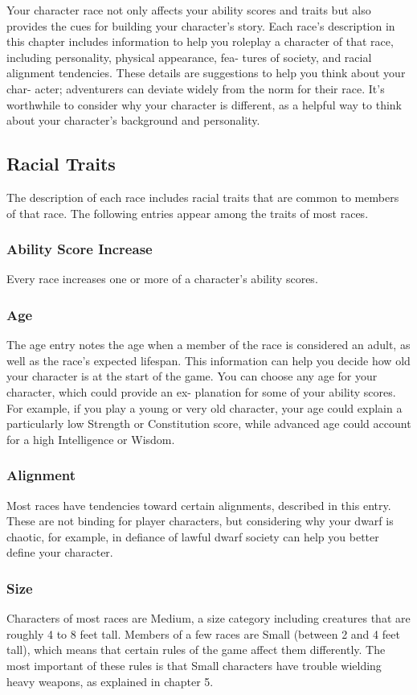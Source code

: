 Your character race not only affects your ability scores and traits but also provides the cues for building your character’s story. Each race’s description in this chapter includes information to help you roleplay a character of that race, including personality, physical appearance, fea- tures of society, and racial alignment tendencies. These details are suggestions to help you think about your char- acter; adventurers can deviate widely from the norm for their race. It’s worthwhile to consider why your character is different, as a helpful way to think about your character’s background and personality.

\subsection{Racial Traits}
The description of each race includes racial traits that are common to members of that race. The following entries appear among the traits of most races.

\subsubsection{Ability Score Increase}
Every race increases one or more of a character’s ability scores.

\subsubsection{Age}
The age entry notes the age when a member of the race is considered an adult, as well as the race’s expected lifespan. This information can help you decide how old your character is at the start of the game. You can choose any age for your character, which could provide an ex- planation for some of your ability scores. For example, if you play a young or very old character, your age could explain a particularly low Strength or Constitution score, while advanced age could account for a high Intelligence or Wisdom.

\subsubsection{Alignment}
Most races have tendencies toward certain alignments, described in this entry. These are not binding for player characters, but considering why your dwarf is chaotic, for example, in defiance of lawful dwarf society can help you better define your character.

\subsubsection{Size}
Characters of most races are Medium, a size category including creatures that are roughly 4 to 8 feet tall. Members of a few races are Small (between 2 and 4 feet tall), which means that certain rules of the game affect them differently. The most important of these rules is that Small characters have trouble wielding heavy weapons, as explained in chapter 5.

